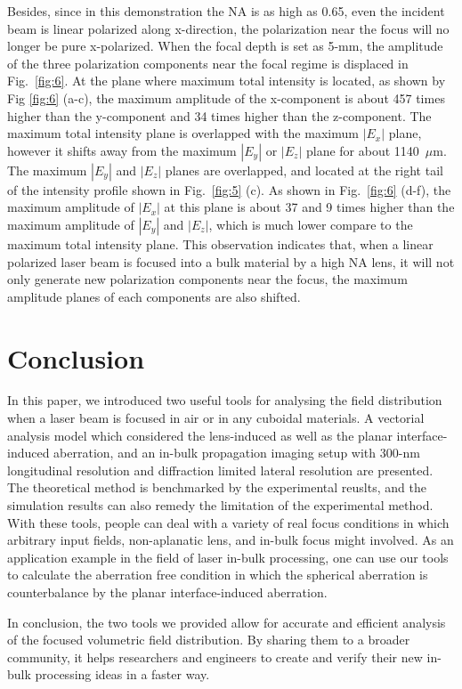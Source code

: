 \documentclass[9pt,twocolumn,twoside]{osajnl}
\begin{document}
Besides, since in this demonstration the NA is as high as 0.65, even the incident beam is linear polarized along x-direction, the polarization near the focus will no longer be pure x-polarized. When the focal depth is set as 5-mm, the amplitude of the three polarization components near the focal regime is displaced in Fig.~\ref{fig:6}. At the plane where maximum total intensity is located, as shown by Fig \ref{fig:6} (a-c), the maximum amplitude of the x-component is about 457 times higher than the y-component and 34 times higher than the z-component. The maximum total intensity plane is overlapped with the maximum $|E_x|$ plane, however it shifts away from the maximum $|E_y|$ or $|E_z|$ plane for about 1140~$\mu$m. The maximum $|E_y|$ and $|E_z|$ planes are overlapped, and located at the right tail of the intensity profile shown in Fig.~\ref{fig:5} (c). As shown in Fig.~\ref{fig:6} (d-f), the maximum amplitude of $|E_x|$ at this plane is about 37 and 9 times higher than the maximum amplitude of $|E_y|$ and $|E_z|$, which is much lower compare to the maximum total intensity plane. This observation indicates that, when a linear polarized laser beam is focused into a bulk material by a high NA lens, it will not only generate new polarization components near the focus, the maximum amplitude planes of each components are also shifted.
\section{Conclusion}
In this paper, we introduced two useful tools for analysing the field distribution when a laser beam is focused in air or in any cuboidal materials. A vectorial analysis model which considered the lens-induced as well as the planar interface-induced aberration, and an in-bulk propagation imaging setup with 300-nm longitudinal resolution and diffraction limited lateral resolution are presented. The theoretical method is benchmarked by the experimental reuslts, and the simulation results can also remedy the limitation of the experimental method. With these tools, people can deal with a variety of real focus conditions in which arbitrary input fields, non-aplanatic lens, and in-bulk focus might involved. As an application example in the field of laser in-bulk processing, one can use our tools to calculate the aberration free condition in which the spherical aberration is counterbalance by the planar interface-induced aberration.

In conclusion, the two tools we provided allow for accurate and efficient analysis of the focused volumetric field distribution. By sharing them to a broader community, it helps researchers and engineers to create and verify their new in-bulk processing ideas in a faster way.
\end{document}

